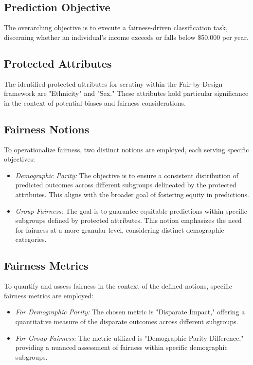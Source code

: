 \subsection{Prediction Objective}

The overarching objective is to execute a fairness-driven classification task, discerning whether an individual's income exceeds or falls below \$50,000 per year.

\subsection{Protected Attributes}

The identified protected attributes for scrutiny within the Fair-by-Design framework are "Ethnicity" and "Sex." These attributes hold particular significance in the context of potential biases and fairness considerations.

\subsection{Fairness Notions}

To operationalize fairness, two distinct notions are employed, each serving specific objectives:

\begin{itemize}
    \item \emph{Demographic Parity:} The objective is to ensure a consistent distribution of predicted outcomes across different subgroups delineated by the protected attributes. This aligns with the broader goal of fostering equity in predictions.

    \item \emph{Group Fairness:} The goal is to guarantee equitable predictions within specific subgroups defined by protected attributes. This notion emphasizes the need for fairness at a more granular level, considering distinct demographic categories.
\end{itemize}

\subsection{Fairness Metrics}

To quantify and assess fairness in the context of the defined notions, specific fairness metrics are employed:

\begin{itemize}
    \item \emph{For Demographic Parity:} The chosen metric is "Disparate Impact," offering a quantitative measure of the disparate outcomes across different subgroups.

    \item \emph{For Group Fairness:} The metric utilized is "Demographic Parity Difference," providing a nuanced assessment of fairness within specific demographic subgroups.
\end{itemize}

